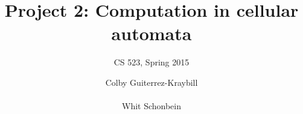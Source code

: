 \documentclass{acm_proc_article-sp}
\begin{document}
\title{Project 2: Computation in cellular automata}
\subtitle{CS 523, Spring 2015}
\author{
\alignauthor
Colby Guiterrez-Kraybill\\
       \\
\alignauthor
Whit Schonbein\\
       \\
}
\maketitle
{}




 
\end{document}

